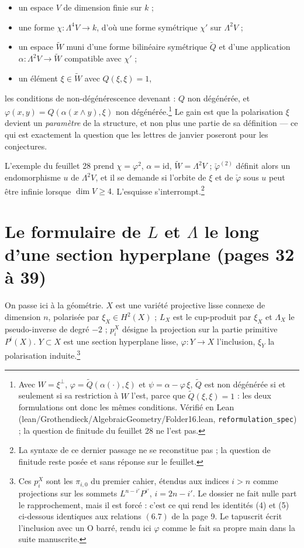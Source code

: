 \documentclass[11pt,a4paper]{article}
\begin{document}
\begin{itemize}
  \item un espace $V$ de dimension finie sur $k$ ;
  \item une forme $\chi \colon \Lambda^{4}V \to k$, d'où une forme symétrique
  $\chi'$ sur $\Lambda^{2}V$ ;
  \item un espace $\tilde{W}$ muni d'une forme bilinéaire symétrique
  $\tilde{Q}$ et d'une application $\alpha \colon \Lambda^{2}V \to \tilde{W}$
  compatible avec $\chi'$ ;
  \item un élément $\xi \in \tilde{W}$ avec $Q(\xi,\xi) = 1$,
\end{itemize}

les conditions de non-dégénérescence devenant : $Q$ non dégénérée, et
$\varphi(x,y) = Q(\alpha(x \wedge y), \xi)$ non dégénérée.\footnote{Avec
$W = \xi^{\perp}$, $\varphi = \tilde Q(\alpha(\cdot), \xi)$ et $\psi = \alpha -
\varphi\,\xi$, $\tilde Q$ est non dégénérée si et seulement si sa restriction à
$W$ l'est, parce que $\tilde Q(\xi,\xi) = 1$ : les deux formulations ont donc
les mêmes conditions. Vérifié en Lean (lean/Grothendieck/AlgebraicGeometry/Folder16.lean,
\texttt{reformulation\_spec}) ; la question de finitude du feuillet 28 ne
l'est pas.} Le gain est que la
polarisation $\xi$ devient un \emph{paramètre} de la structure, et non plus une
partie de sa définition --- ce qui est exactement la question que les lettres
de janvier poseront pour les conjectures.

L'exemple du feuillet 28 prend $\chi = \varphi^{2}$, $\alpha = \mathrm{id}$,
$\tilde{W} = \Lambda^{2}V$ ; $\check\varphi^{(2)}$ définit alors un
endomorphisme $u$ de $\Lambda^{2}V$, et il se demande si l'orbite de $\xi$ et
de $\check\varphi$ sous $u$ peut être infinie lorsque $\dim V \geqslant 4$.
L'esquisse s'interrompt.\footnote{La syntaxe de ce dernier passage ne se
reconstitue pas ; la question de finitude reste posée et sans réponse sur le
feuillet.}

\section*{Le formulaire de $L$ et $\Lambda$ le long d'une section hyperplane (pages 32 à 39)}

On passe ici à la géométrie. $X$ est une variété projective lisse connexe de
dimension $n$, polarisée par $\xi_{X} \in H^{2}(X)$ ; $L_{X}$ est le cup-produit
par $\xi_{X}$ et $\Lambda_{X}$ le pseudo-inverse de degré $-2$ ;
$p^{X}_{i}$ désigne la projection sur la partie primitive $P^{i}(X)$.
$Y \subset X$ est une section hyperplane lisse, $\varphi \colon Y \to X$
l'inclusion, $\xi_{Y}$ la polarisation induite.\footnote{Ces $p^{X}_{i}$ sont
les $\pi_{i,0}$ du premier cahier, étendus aux indices $i > n$ comme
projections sur les sommets $L^{n-i'}P^{i'}$, $i = 2n - i'$. Le dossier ne fait
nulle part le rapprochement, mais il est forcé : c'est ce qui rend les
identités (4) et (5) ci-dessous identiques aux relations $(6.7)$ de la page 9.
Le tapuscrit écrit l'inclusion avec un O barré, rendu ici $\varphi$ comme le
fait sa propre main dans la suite manuscrite.}
\end{document}
